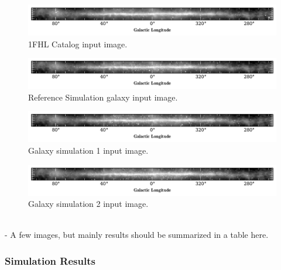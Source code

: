 \documentclass{PoS}
\begin{document}
\begin{figure}
  \begin{center}
      \includegraphics[width=\textwidth]{figures/1FHL.pdf}
  \caption{1FHL Catalog input image.}
  \end{center}
\end{figure}

\begin{figure}
  \begin{center}
      \includegraphics[width=\textwidth]{figures/SIM1.pdf}
  \caption{Reference Simulation galaxy input image.}
  \end{center}
\end{figure}

\begin{figure}
  \begin{center}
      \includegraphics[width=\textwidth]{figures/SIM2.pdf}
  \caption{Galaxy simulation 1 input image.}
  \end{center}
\end{figure}

\begin{figure}
  \begin{center}
      \includegraphics[width=\textwidth]{figures/SIM3.pdf}
  \caption{Galaxy simulation 2 input image.}
  \end{center}
\end{figure}
\\
- A few images, but mainly results should be summarized in a table here.


\subsubsection{Simulation Results}
\end{document}
